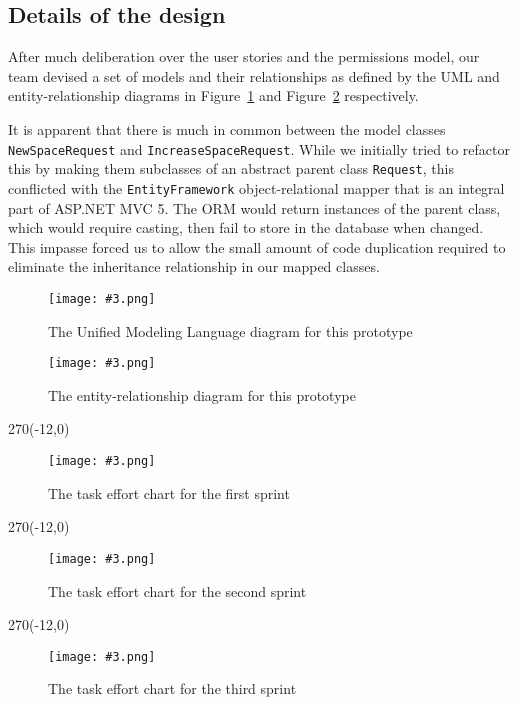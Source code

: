 \documentclass[a4paper,titlepage,12pt]{article}
\newcommand\figimg[4][\textwidth]{
	\begin{figure}
		\caption{#4}
		\label{fig:#2}
		\texttt{[image: \#3.png]}
	\end{figure}
}
\begin{document}
\subsection{Details of the design}

After much deliberation over the user stories and the permissions model, our
team devised a set of models and their relationships as defined by the UML and
entity-relationship diagrams in Figure~\ref{fig:uml} and Figure~\ref{fig:erd}
respectively.

It is apparent that there is much in common between the model classes
\texttt{NewSpaceRequest} and \texttt{IncreaseSpaceRequest}. While
we initially tried to refactor this by making them subclasses of an abstract
parent class \texttt{Request}, this conflicted with the
\texttt{EntityFramework} object-relational mapper that is an integral part of
ASP.NET MVC 5. The ORM would return instances of the parent class, which would
require casting, then fail to store in the database when changed. This
impasse forced us to allow the small amount of code duplication required
to eliminate the inheritance relationship in our mapped classes.

\figimg{uml}{uml}{The Unified Modeling Language diagram for this prototype}

\figimg{erd}{erd}{The entity-relationship diagram for this prototype}

\begin{landscape}
	\quad %
	\thispagestyle{empty}
	\begin{textblock}{270}(-12,0)
		\figimg[270mm]{effort1}{effort1}
			{The task effort chart for the first sprint}
	\end{textblock}
\end{landscape}

\begin{landscape}
	\quad %
	\thispagestyle{empty}
	\begin{textblock}{270}(-12,0)
		\figimg[270mm]{effort2}{effort2}
			{The task effort chart for the second sprint}
	\end{textblock}
\end{landscape}

\begin{landscape}
	\quad %
	\thispagestyle{empty}
	\begin{textblock}{270}(-12,0)
		\figimg[270mm]{effort3}{effort3}
			{The task effort chart for the third sprint}
	\end{textblock}
\end{landscape}
\end{document}
